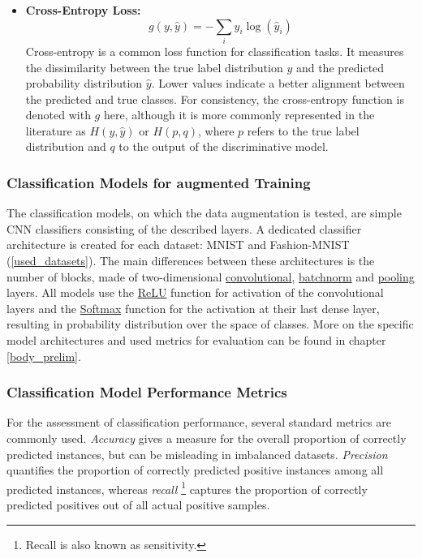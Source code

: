 \begin{itemize}
    \item \textbf{Cross-Entropy Loss:} \label{theoretical_loss_crossentropy}
    \begin{equation}
        g(y, \hat{y}) = -\sum_{i} y_i \log(\hat{y}_i)
    \end{equation}
    Cross-entropy is a common loss function for classification tasks. It measures the dissimilarity between the true label distribution \( y \) and the predicted probability distribution \( \hat{y} \). Lower values indicate a better alignment between the predicted and true classes. For consistency, the cross-entropy function is denoted with \( g \) here, although it is more commonly represented in the literature as \( H(y, \hat{y}) \) or \( H(p, q) \), where \( p \) refers to the true label distribution and \( q \) to the output of the discriminative model.


\end{itemize}

\subsubsection{Classification Models for augmented Training}
The classification models, on which the data augmentation is tested, are simple CNN classifiers consisting of the described layers. A dedicated classifier architecture is created for each dataset: MNIST and Fashion-MNIST (\ref{used_datasets}). The main differences between these architectures is the number of blocks, made of two-dimensional \hyperref[theoretical_classification_conv_layers]{convolutional}, \hyperref[theoretical_classification_batchnorm_layers]{batchnorm} and \hyperref[theoretical_classification_pooling_layers]{pooling} layers. All models use the \hyperref[theoretical_activations_relu]{ReLU} function for activation of the convolutional layers and the \hyperref[theoretical_activations_softmax]{Softmax} function for the activation at their last dense layer, resulting in probability distribution over the space of classes. More on the specific model architectures and used metrics for evaluation can be found in chapter \ref{body_prelim}.

\subsubsection{Classification Model Performance Metrics} \label{theory_classification_performanc_metrics}
For the assessment of classification performance, several standard metrics are commonly used. \textit{Accuracy} gives a measure for the overall proportion of correctly predicted instances, but can be misleading in imbalanced datasets. \textit{Precision} quantifies the proportion of correctly predicted positive instances among all predicted instances, whereas \textit{recall} \footnote{Recall is also known as sensitivity.} captures the proportion of correctly predicted positives out of all actual positive samples. 

